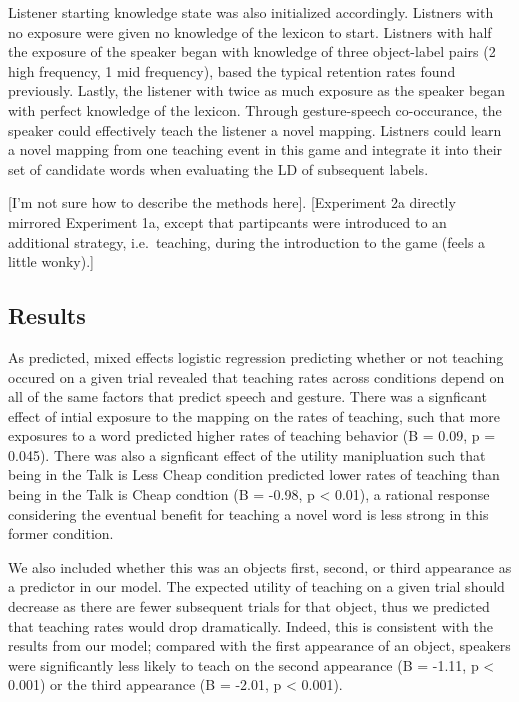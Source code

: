 \documentclass[10pt, letterpaper]{article}
\begin{document}
Listener starting knowledge state was also initialized accordingly.
Listners with no exposure were given no knowledge of the lexicon to
start. Listners with half the exposure of the speaker began with
knowledge of three object-label pairs (2 high frequency, 1 mid
frequency), based the typical retention rates found previously. Lastly,
the listener with twice as much exposure as the speaker began with
perfect knowledge of the lexicon. Through gesture-speech co-occurance,
the speaker could effectively teach the listener a novel mapping.
Listners could learn a novel mapping from one teaching event in this
game and integrate it into their set of candidate words when evaluating
the LD of subsequent labels.

{[}I'm not sure how to describe the methods here{]}. {[}Experiment 2a
directly mirrored Experiment 1a, except that partipcants were introduced
to an additional strategy, i.e.~teaching, during the introduction to the
game (feels a little wonky).{]}

\subsection{Results}\label{results-2}

As predicted, mixed effects logistic regression predicting whether or
not teaching occured on a given trial revealed that teaching rates
across conditions depend on all of the same factors that predict speech
and gesture. There was a signficant effect of intial exposure to the
mapping on the rates of teaching, such that more exposures to a word
predicted higher rates of teaching behavior (B = 0.09, p = 0.045). There
was also a signficant effect of the utility manipluation such that being
in the Talk is Less Cheap condition predicted lower rates of teaching
than being in the Talk is Cheap condtion (B = -0.98, p \textless{}
0.01), a rational response considering the eventual benefit for teaching
a novel word is less strong in this former condition.

We also included whether this was an objects first, second, or third
appearance as a predictor in our model. The expected utility of teaching
on a given trial should decrease as there are fewer subsequent trials
for that object, thus we predicted that teaching rates would drop
dramatically. Indeed, this is consistent with the results from our
model; compared with the first appearance of an object, speakers were
significantly less likely to teach on the second appearance (B = -1.11,
p \textless{} 0.001) or the third appearance (B = -2.01, p \textless{}
0.001).
\end{document}
